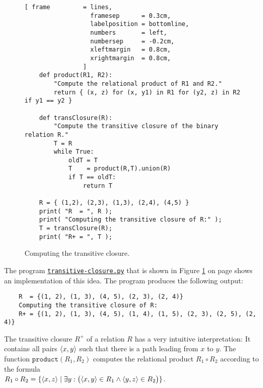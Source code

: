 \begin{figure}[!ht]
  \centering
\begin{Verbatim}[ frame         = lines, 
                  framesep      = 0.3cm, 
                  labelposition = bottomline,
                  numbers       = left,
                  numbersep     = -0.2cm,
                  xleftmargin   = 0.8cm,
                  xrightmargin  = 0.8cm,
                ]
    def product(R1, R2):
        "Compute the relational product of R1 and R2."
        return { (x, z) for (x, y1) in R1 for (y2, z) in R2 if y1 == y2 }
    
    def transClosure(R):
        "Compute the transitive closure of the binary relation R."
        T = R
        while True:
            oldT = T
            T    = product(R,T).union(R)
            if T == oldT:
                return T
    
    R = { (1,2), (2,3), (1,3), (2,4), (4,5) }
    print( "R  = ", R );
    print( "Computing the transitive closure of R:" );
    T = transClosure(R);
    print( "R+ = ", T );
\end{Verbatim} 
\vspace*{-0.3cm}
\caption{Computing the transitive closure.}  
\label{fig:transitive-closure.py}
\end{figure} %

\noindent
The program 
\href{https://github.com/karlstroetmann/Logic/blob/master/Python/transitive-closure.py}{\texttt{transitive-closure.py}}
that is shown in Figure
\ref{fig:transitive-closure.py} on page \pageref{fig:transitive-closure.py} shows an implementation of this idea.
The program produces the following output:
\begin{verbatim}
    R  = {(1, 2), (1, 3), (4, 5), (2, 3), (2, 4)}
    Computing the transitive closure of R:
    R+ = {(1, 2), (1, 3), (4, 5), (1, 4), (1, 5), (2, 3), (2, 5), (2, 4)}
\end{verbatim}
The transitive closure $R^+$ of a relation $R$ has a very intuitive interpretation:
It contains all pairs $\pair(x,y)$ such that there is a path leading from 
$x$ to $y$.  
The function $\texttt{product}(R_1, R_2)$ computes the relational product $R_1\circ R_2$ 
according to the formula
\\[0.2cm]
\hspace*{1.3cm}
$R_1 \circ R_2 = \{ \langle x, z \rangle \mid \exists y:\bigl(\pair(x,y) \in R_1 \wedge \pair(y,z) \in R_2\bigr) \}$.



